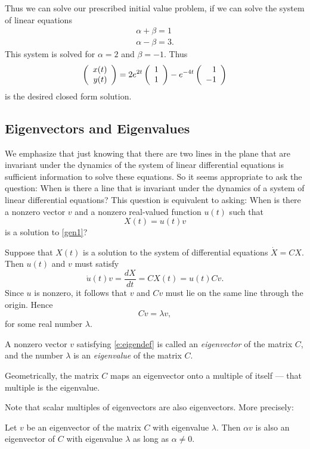 \documentclass{ximera}
\begin{document}
Thus we can solve our prescribed initial value problem, if we can
solve the system of linear equations
\begin{eqnarray*}
\alpha + \beta = 1\ \\
\alpha - \beta = 3.
\end{eqnarray*}
This system is solved for $\alpha=2$ and $\beta=-1$. Thus
\[
\left(\begin{array}{r} x(t) \\ y(t)\end{array}\right) = 2e^{2t}\left(\begin{array}{r} 1 \\ 1\end{array}\right) - e^{-4t}\left(\begin{array}{r} 1 \\ -1\end{array}\right)
\]
is the desired closed form solution.

\subsection*{Eigenvectors and Eigenvalues}

We emphasize that just knowing that there are two lines in the
plane that are invariant under the dynamics of the system of
linear differential equations is sufficient information to solve
these equations.  So it seems appropriate to ask the question:
When is there a line that is invariant under the dynamics of a
system of linear differential equations?  This question is
equivalent to asking:  When is there a nonzero vector $v$ and a
nonzero real-valued function $u(t)$ such that
\[
X(t) = u(t) v
\]
is a solution to \eqref{gen1}?

Suppose that $X(t)$ is a solution to the system of differential
equations $\dot{X}=CX$.  Then $u(t)$ and $v$ must satisfy
\begin{equation}  \label{E:diffdir}
\dot{u}(t)v = \frac{dX}{dt} = CX(t) = u(t) Cv.
\end{equation}
Since $u$ is nonzero, it follows that $v$ and $Cv$ must lie on the
same line through the origin.  Hence
\begin{equation}  \label{e:eigendef}
Cv = \lambda v,
\end{equation}
for some real number $\lambda$.

\begin{definition}  \label{D:eigenvalue1}
A nonzero vector $v$ satisfying \eqref{e:eigendef} is called an
{\em eigenvector\/}  of the matrix $C$, and
the number $\lambda$ is an {\em eigenvalue\/} 
of the matrix $C$.
\end{definition}
Geometrically, the matrix $C$ maps an eigenvector onto a multiple
of itself --- that multiple is the eigenvalue.

Note that scalar multiples of eigenvectors are also eigenvectors.  More 
precisely:
\begin{lemma}  \label{L:e'vector}
Let $v$ be an eigenvector of the matrix $C$ with eigenvalue $\lambda$.   
Then $\alpha v$ is also an eigenvector of $C$ with eigenvalue $\lambda$ 
as long as $\alpha\neq 0$.
\end{lemma}
\end{document}
